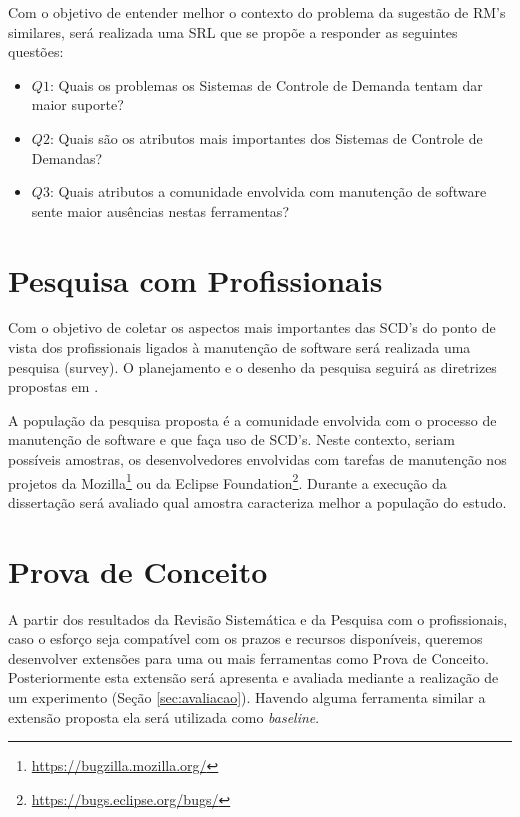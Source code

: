 \documentclass[msc,proposal,hidelot,hideabstract]{ppgccufmg} %
\begin{document}
Com o objetivo de entender melhor o contexto do problema da sugestão de RM's
similares, será realizada uma SRL que se propõe a responder as seguintes
questões:

\begin{itemize}
  \item \textbf{$Q1$}: Quais os problemas os Sistemas de Controle de Demanda tentam dar maior suporte?
  \item \textbf{$Q2$}: Quais são os atributos mais importantes dos Sistemas de
    Controle de Demandas?
  \item \textbf{$Q3$}: Quais atributos a comunidade envolvida com manutenção de
    software sente maior ausências nestas ferramentas?
  \end{itemize}

\section{Pesquisa com Profissionais}
\label{sec:survey}
Com o objetivo de coletar os aspectos mais importantes das SCD's do ponto de
vista dos profissionais ligados à manutenção de software será realizada uma
 pesquisa (survey). O planejamento e o desenho da pesquisa seguirá
as diretrizes propostas em \cite{wohlin2012experimentation}.

A população da pesquisa proposta é a comunidade envolvida com o processo de
manutenção de software e que faça uso de SCD's. Neste contexto, seriam
possíveis amostras, os desenvolvedores envolvidas com tarefas de manutenção nos
projetos da Mozilla\footnote{\url{https://bugzilla.mozilla.org/}} ou da
Eclipse Foundation\footnote{\url{https://bugs.eclipse.org/bugs/}}. Durante a
execução da dissertação será avaliado qual amostra caracteriza melhor a
população do estudo.

\section{Prova de Conceito}
\label{sec:prova-conceito}

A partir dos resultados da Revisão Sistemática e da Pesquisa com o
profissionais, caso o esforço seja compatível com os prazos e recursos disponíveis, queremos
desenvolver extensões para uma ou mais ferramentas como Prova de Conceito. Posteriormente esta extensão
será apresenta e avaliada mediante a realização de um experimento (Seção
\ref{sec:avaliacao}). Havendo alguma ferramenta similar a extensão proposta ela
será utilizada como \textit{baseline}.
\end{document}
